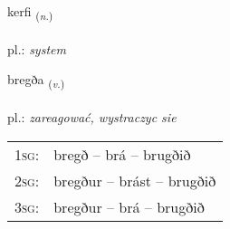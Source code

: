\documentclass[frontgrid, backgrid]{flacards}\usepackage[]{graphicx}\usepackage[]{xcolor}
\begin{document}
\renewcommand{\blhead}{\vskip5pt {\small\bfseries\footnotesize Nafnorð | rzeczownik }}
\renewcommand{\bcfoot}{\vskip5pt \hspace{2pt}{\small\bfseries\footnotesize 1K}}


{kerfi \small{\textsubscript{(\textit{n.})}} \\[1ex] %
\textphonetic{[cʰɛrvɪ]} \\
pl.: \emph{system} \\  [2ex]
\renewcommand*{\arraystretch}{0.8}
}

\renewcommand{\flhead}{\vskip5pt \fboxsep=0pt {\small\bfseries\footnotesize Sagnorð | czasownik}}
\renewcommand{\fcfoot}{\vskip5pt \fboxsep=0pt \hspace{2pt}{\small\bfseries\footnotesize 1K}}

\renewcommand{\blhead}{\vskip5pt {\small\bfseries\footnotesize Sagnorð | czasownik }}
\renewcommand{\bcfoot}{\vskip5pt \hspace{2pt}{\small\bfseries\footnotesize 1K}}


{bregða \small{\textsubscript{(\textit{v.})}} \\[1ex] %
\textphonetic{[prɛɣða]} \\
pl.: \emph{zareagować, wystraczyc sie} \\  [2ex]
\renewcommand*{\arraystretch}{0.8}
\begin{tabular}{p{1cm}l}
\textsc{1sg}: & bregð -- brá -- brugðið \\ 
\textsc{2sg}: & bregður -- brást -- brugðið \\ 
\textsc{3sg}: & bregður -- brá -- brugðið \\ 
\end{tabular}
}

\renewcommand{\flhead}{\vskip5pt \fboxsep=0pt {\small\bfseries\footnotesize Atviksorð | przysłówek}}
\renewcommand{\fcfoot}{\vskip5pt \fboxsep=0pt \hspace{2pt}{\small\bfseries\footnotesize 1K}}
\end{document}
